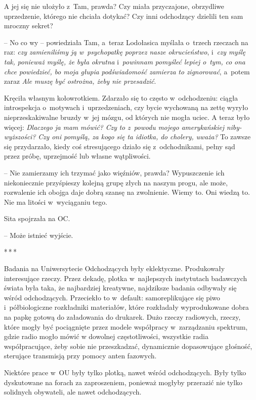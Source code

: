 \documentclass[oneside,polish,11pt,sfheadings]{mwbk}
\newcommand{\threeast}{\bigskip\par\centerline{*\,*\,*}\medskip\par}
\begin{document}
A jej się nie ułożyło z~Tam, prawda? Czy miała przyczajone, obrzydliwe
uprzedzenie, którego nie chciała dotykać? Czy inni odchodzący dzielili
ten sam mroczny sekret?

-- No co wy -- powiedziała Tam, a~teraz Lodołasica myślała o~trzech
rzeczach na raz: \textit{czy zamieniliśmy ją w~psychopatkę poprzez nasze
okrucieństwo}, i~\textit{czy myślę tak, ponieważ myślę, że była okrutna} i~\textit{powinnam pomyśleć lepiej o~tym, co ona chce powiedzieć, bo moja
głupia podświadomość zamierza to zignorować}, a~potem zaraz \textit{Ale
muszę być ostrożna, żeby nie przesadzić}.

Kręciła własnym kołowrotkiem. Zdarzało się to często w~odchodzeniu:
ciągła introspekcja o~motywach i~uprzedzeniach, czy bycie wychowaną na
zettę wyryło nieprzeskakiwalne bruzdy w~jej mózgu, od których nie mogła
uciec. A teraz było więcej: \textit{Dlaczego ja mam mówić? Czy to z~powodu
mojego amerykańskiej niby-wyższości? Czy oni pomyślą, za kogo się ta
idiotka, do cholery, uważa? }To zawsze się przydarzało, kiedy coś
stresującego działo się z~odchodnikami, pełny sąd przez próbę,
uprzejmość lub własne wątpliwości.

-- Nie zamierzamy ich trzymać jako więźniów, prawda? Wypuszczenie ich
niekoniecznie przyśpieszy kolejną grupę złych na naszym progu, ale może,
rozwalenie ich obojga daje dobrą szansę na zwolnienie. Wiemy to. Oni
wiedzą to. Nie ma litości w~wyciąganiu tego.

Sita spojrzała na OC. 

-- Może istnieć wyjście.

\threeast

Badania na Uniwersytecie Odchodzących były eklektyczne. Produkowały
interesujące rzeczy. Przez dekadę, plotka w~najlepszych instytutach
badawczych świata była taka, że najbardziej kreatywne, najdziksze
badania odbywały się wśród odchodzących. Przeciekło to w~default:
samoreplikujące się piwo i~półbiologiczne rozkładniki materiałów, które
rozkładały wyprodukowane dobra na papkę gotową do załadowania do
drukarek. Dużo rzeczy radiowych, rzeczy, które mogły być pociągnięte
przez modele współpracy w~zarządzaniu spektrum, gdzie radio mogło mówić
w dowolnej częstotliwości, wszystkie radia współpracujące, żeby sobie
nie przeszkadzać, dynamicznie dopasowujące głośność, sterujące
transmisją przy pomocy anten fazowych.

Niektóre prace w~OU były tylko plotką, nawet wśród odchodzących. Były
tylko dyskutowane na forach za zaproszeniem, ponieważ mogłyby przerazić
nie tylko solidnych obywateli, ale nawet odchodzących.
\end{document}

